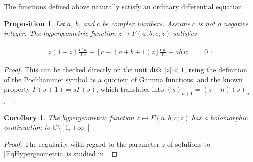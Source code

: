\documentclass{jams-l}
\newtheorem{proposition}[theorem]{Proposition}
\newtheorem{corollary}[theorem]{Corollary}
\theoremstyle{definition}
\theoremstyle{remark}
\numberwithin{equation}{section}
\begin{document}
            The functions defined above naturally satisfy an ordinary differential equation.
        
            \begin{proposition}
        
                Let $a$, $b$, and $c$ be complex numbers. Assume $c$ is not a negative integer. The hypergeometric function $z \longmapsto F \left( a, b; c; z \right)$ satisfies
                
                \begin{equation}
                \label{EqHypergeometric}
                    \begin{array}{lll}
                        z \left( 1 - z \right) \frac{\mathrm{d}^2 w}{\mathrm{d}z^2} + \left[ c - \left( a + b + 1 \right) z \right] \frac{\mathrm{d}w}{\mathrm{d}z} - ab \, w & = & 0
                    \end{array} .
                \end{equation}
        
            \end{proposition}
        
            \begin{proof}
        
                This can be checked directly on the unit disk $\left \vert z \right \vert < 1$, using the definition of the Pochhammer symbol as a quotient of Gamma functions, and the known property $\Gamma \left( s+1 \right) = s \Gamma \left( s \right)$, which translates into $\left( s \right)_{n+1} = \left( s+n \right) \left( s \right)_n$.
        
            \end{proof}
            
            \begin{corollary}
        
                The hypergeometric function $z \longmapsto F \left( a, b; c; z \right)$ has a holomorphic continuation to $\mathbb{C} \setminus \left[ 1, + \infty \right[$.
        
            \end{corollary}
            
            \begin{proof}
            
                The regularity with regard to the parameter $z$ of solutions to \eqref{EqHypergeometric} is studied in \cite[Sec. 5.3.1]{MR1429619}.
            
            \end{proof}
            
\end{document}
